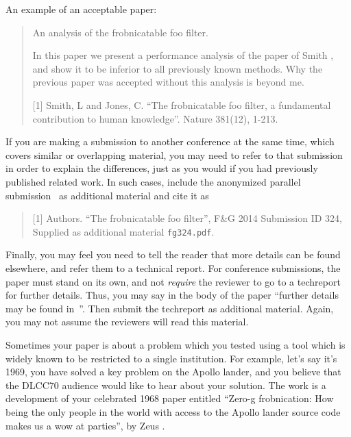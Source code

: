 An example of an acceptable paper:

\begin{quote}
\begin{center}
An analysis of the frobnicatable foo filter.
\end{center}

In this paper we present a performance analysis of the paper of Smith \etal [1], and show it to be inferior to all previously known methods.
Why the previous paper was accepted without this analysis is beyond me.

[1] Smith, L and Jones, C. ``The frobnicatable foo filter, a fundamental contribution to human knowledge''. Nature 381(12), 1-213.
\end{quote}

If you are making a submission to another conference at the same time, which covers similar or overlapping material, you may need to refer to that submission in order to explain the differences, just as you would if you had previously published related work.
In such cases, include the anonymized parallel submission~\cite{Authors14} as additional material and cite it as
\begin{quote}
[1] Authors. ``The frobnicatable foo filter'', F\&G 2014 Submission ID 324, Supplied as additional material {\tt fg324.pdf}.
\end{quote}

Finally, you may feel you need to tell the reader that more details can be found elsewhere, and refer them to a technical report.
For conference submissions, the paper must stand on its own, and not {\em require} the reviewer to go to a techreport for further details.
Thus, you may say in the body of the paper ``further details may be found in~\cite{Authors14b}''.  Then submit the techreport as additional material.
Again, you may not assume the reviewers will read this material.

Sometimes your paper is about a problem which you tested using a tool which is widely known to be restricted to a single institution.
For example, let's say it's 1969, you have solved a key problem on the Apollo lander, and you believe that the DLCC70 audience would like to hear about your solution.
The work is a development of your celebrated 1968 paper entitled ``Zero-g frobnication: How being the only people in the world with access to the Apollo lander source code makes us a wow at parties'', by Zeus \etal.

